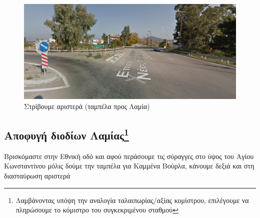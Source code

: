 \begin{figure}[H]
		\includegraphics[width=\textwidth]{images/athina-lamia/tragana/tragana7.PNG}
			\caption{Στρίβουμε αριστερά (ταμπέλα προς Λαμία)}
\end{figure}
\newpage
\begin{center}
\section*{Αποφυγή διοδίων Λαμίας\footnote{Λαμβάνοντας υπόψη την αναλογία ταλαιπωρίας/αξίας κομίστρου, επιλέγουμε να πληρώσουμε το κόμιστρο του συγκεκριμένου σταθμού}}
\end{center}
Βρισκόμαστε στην Εθνική οδό και αφού περάσουμε τις σύραγγες στο ύψος του Αγίου Κωνσταντίνου μόλις δούμε την ταμπέλα για Καμμένα Βούρλα, κάνουμε δεξιά και στη διασταύρωση αριστερά
		
